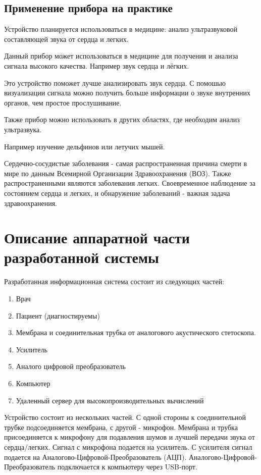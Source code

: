 \documentclass[14pt]{extarticle}
\begin{document}
\subsection{Применение прибора на практике}
Устройство планируется использоваться в медицине: анализ ультразвуковой составляющей звука от сердца и легких.

Данный прибор может использоваться в медицине для получения и анализа сигнала высокого качества. Например звук сердца и лёгких. 

Это устройство поможет лучше анализировать звук сердца. С помошью визуализации сигнала можно получить больше информации о звуке внутренних органов, чем простое прослушивание.

Также прибор можно использовать в других областях, где необходим анализ ультразвука. 

Например изучение дельфинов или летучих мышей. 

Сердечно-сосудистые заболевания - самая распространенная причина смерти в мире по данным Всемирной Организации Здравоохранения (ВОЗ). Также распространенными являются заболевания легких. Своевременное наблюдение за состоянием сердца и легких, и обнаружение заболеваний - важная задача здравоохранения.

\newpage  
\section{Описание аппаратной части разработанной системы}
Разработанная информационная система состоит из следующих частей:
\begin{enumerate}
  \item Врач
  \item Пациент (диагностируемы)
  \item Мембрана и соединительная трубка от аналогового акустического стетоскопа.
  \item Усилитель
  \item Аналого цифровой преобразователь
  \item Компьютер
  \item Удаленный сервер для высокопроизводительных вычислений
\end{enumerate}

Устройство состоит из нескольких частей. С одной стороны к соединительной трубке подсоединяется мембрана, с другой - микрофон. Мембрана и трубка присоединяется к микрофону для подавления шумов и лучшей передачи звука от сердца/легких. Сигнал с микрофона подается на усилитель. С усилителя сигнал подается на Аналогово-Цифровой-Преобразователь (АЦП). Аналогово-Цифровой-Преобразователь подключается к компьютеру через USB-порт.
\end{document}
